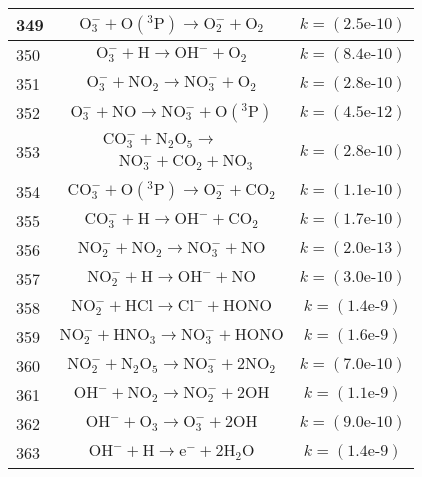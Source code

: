 \begin{longtable}{| m{} | m{}| m{} |}
\hline
 349 & $$ \mathrm{O_3^-} + \mathrm{O(^3P)}\longrightarrow \mathrm{O_2^-} + \mathrm{O_2} $$ & $$k = (\textrm{2.5e-10}) $$ \\
\hline
 350 & $$ \mathrm{O_3^-} + \mathrm{H}\longrightarrow \mathrm{OH^-} + \mathrm{O_2} $$ & $$k = (\textrm{8.4e-10}) $$ \\
\hline
 351 & $$ \mathrm{O_3^-} + \mathrm{NO_2}\longrightarrow \mathrm{NO_3^-} + \mathrm{O_2} $$ & $$k = (\textrm{2.8e-10}) $$ \\
\hline
 352 & $$ \mathrm{O_3^-} + \mathrm{NO}\longrightarrow \mathrm{NO_3^-} + \mathrm{O(^3P)} $$ & $$k = (\textrm{4.5e-12}) $$ \\
\hline
 353 & $$
\begin{aligned}
&\mathrm{CO_3^-} + \mathrm{N_2O_5} \longrightarrow \\
&\quad \mathrm{NO_3^-} + \mathrm{CO_2} + \mathrm{NO_3}
\end{aligned}
$$ & $$k = (\textrm{2.8e-10}) $$ \\
\hline
 354 & $$ \mathrm{CO_3^-} + \mathrm{O(^3P)}\longrightarrow \mathrm{O_2^-} + \mathrm{CO_2} $$ & $$k = (\textrm{1.1e-10}) $$ \\
\hline
 355 & $$ \mathrm{CO_3^-} + \mathrm{H}\longrightarrow \mathrm{OH^-} + \mathrm{CO_2} $$ & $$k = (\textrm{1.7e-10}) $$ \\
\hline
 356 & $$ \mathrm{NO_2^-} + \mathrm{NO_2}\longrightarrow \mathrm{NO_3^-} + \mathrm{NO} $$ & $$k = (\textrm{2.0e-13}) $$ \\
\hline
 357 & $$ \mathrm{NO_2^-} + \mathrm{H}\longrightarrow \mathrm{OH^-} + \mathrm{NO} $$ & $$k = (\textrm{3.0e-10}) $$ \\
\hline
 358 & $$ \mathrm{NO_2^-} + \mathrm{HCl}\longrightarrow \mathrm{Cl^-} + \mathrm{HONO} $$ & $$k = (\textrm{1.4e-9}) $$ \\
\hline
 359 & $$ \mathrm{NO_2^-} + \mathrm{HNO_3}\longrightarrow \mathrm{NO_3^-} + \mathrm{HONO} $$ & $$k = (\textrm{1.6e-9}) $$ \\
\hline
 360 & $$ \mathrm{NO_2^-} + \mathrm{N_2O_5}\longrightarrow \mathrm{NO_3^-} + 2\mathrm{NO_2} $$ & $$k = (\textrm{7.0e-10}) $$ \\
\hline
 361 & $$ \mathrm{OH^-} + \mathrm{NO_2}\longrightarrow \mathrm{NO_2^-} + 2\mathrm{OH} $$ & $$k = (\textrm{1.1e-9}) $$ \\
\hline
 362 & $$ \mathrm{OH^-} + \mathrm{O_3}\longrightarrow \mathrm{O_3^-} + 2\mathrm{OH} $$ & $$k = (\textrm{9.0e-10}) $$ \\
\hline
 363 & $$ \mathrm{OH^-} + \mathrm{H}\longrightarrow \mathrm{e^-} + 2\mathrm{H_2O} $$ & $$k = (\textrm{1.4e-9}) $$ \\

\end{longtable}
